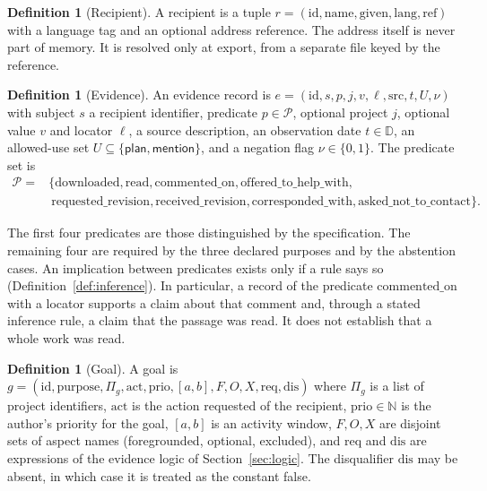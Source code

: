 \documentclass[11pt]{article}
\theoremstyle{definition}
\newtheorem{definition}[theorem]{Definition}
\theoremstyle{remark}
\newcommand{\N}{\mathbb{N}}
\newcommand{\mention}{\mathsf{mention}}
\newcommand{\planuse}{\mathsf{plan}}
\begin{document}
\begin{definition}[Recipient]
A recipient is a tuple $r=(\mathrm{id},\mathrm{name},\mathrm{given},\mathrm{lang},\mathrm{ref})$ with a language tag and an optional address reference. The address itself is never part of memory. It is resolved only at export, from a separate file keyed by the reference.
\end{definition}

\begin{definition}[Evidence]\label{def:evidence}
An evidence record is $e=(\mathrm{id},s,p,j,v,\ell,\mathrm{src},t,U,\nu)$ with subject $s$ a recipient identifier, predicate $p\in\mathcal{P}$, optional project $j$, optional value $v$ and locator $\ell$, a source description, an observation date $t\in\mathbb{D}$, an allowed-use set $U\subseteq\{\planuse,\mention\}$, and a negation flag $\nu\in\{0,1\}$. The predicate set is
\[
\begin{aligned}\mathcal{P}={}&\{\text{downloaded},\text{read},\text{commented\_on},\text{offered\_to\_help\_with},\\&\ \text{requested\_revision},\text{received\_revision},\text{corresponded\_with},\text{asked\_not\_to\_contact}\}.\end{aligned}
\]
\end{definition}

The first four predicates are those distinguished by the specification. The remaining four are required by the three declared purposes and by the abstention cases. An implication between predicates exists only if a rule says so (Definition~\ref{def:inference}). In particular, a record of the predicate $\text{commented\_on}$ with a locator supports a claim about that comment and, through a stated inference rule, a claim that the passage was read. It does not establish that a whole work was read.

\begin{definition}[Goal]\label{def:goal}
A goal is $g=(\mathrm{id},\mathrm{purpose},\Pi_g,\mathrm{act},\mathrm{prio},[a,b],F,O,X,\mathrm{req},\mathrm{dis})$ where $\Pi_g$ is a list of project identifiers, $\mathrm{act}$ is the action requested of the recipient, $\mathrm{prio}\in\N$ is the author's priority for the goal, $[a,b]$ is an activity window, $F,O,X$ are disjoint sets of aspect names (foregrounded, optional, excluded), and $\mathrm{req}$ and $\mathrm{dis}$ are expressions of the evidence logic of Section~\ref{sec:logic}. The disqualifier $\mathrm{dis}$ may be absent, in which case it is treated as the constant false.
\end{definition}
\end{document}
